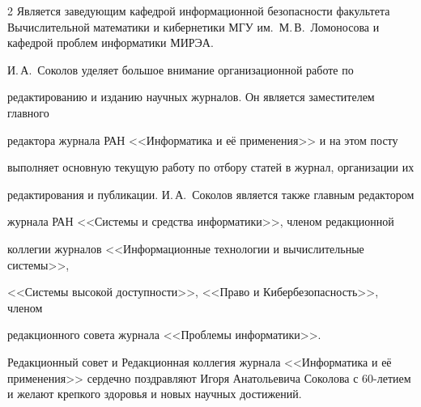 \begin{multicols}{2}
Является заведующим кафедрой информационной безопасности факультета Вычислительной математики и кибернетики МГУ им.\ М.\,В.~Ломоносова и кафедрой проблем информатики МИРЭА.



И.\,А.~Соколов уделяет большое внимание организационной работе по

редактированию и изданию научных журналов. Он является заместителем главного

редактора журнала РАН <<Информатика и её применения>> и на этом посту

выполняет основную текущую работу по отбору статей в журнал, организации их

редактирования и публикации. И.\,А.~Соколов является также главным редактором

журнала РАН <<Системы и средства информатики>>, членом редакционной

коллегии журналов <<Информационные технологии и вычислительные системы>>,

<<Сис\-те\-мы высокой доступности>>, <<Право и Кибер\-без\-опас\-ность>>, членом

редакционного совета журнала <<Проб\-ле\-мы информатики>>.



\bigskip



Редакционный совет и Редакционная коллегия журнала <<Информатика и её применения>> сердечно поздравляют Игоря Анатольевича Соколова с 60-ле\-ти\-ем и желают крепкого здоровья и новых научных достижений.










\end{multicols}




